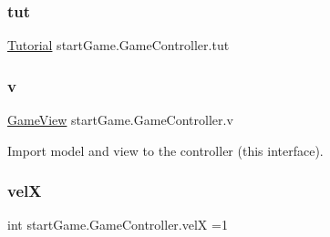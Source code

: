 \hypertarget{classstart_game_1_1_game_controller_ae807267b0bf97687ef3c7d57e815414e}{}\label{classstart_game_1_1_game_controller_ae807267b0bf97687ef3c7d57e815414e} 
\subsubsection{\texorpdfstring{tut}{tut}}
{\footnotesize\ttfamily \hyperlink{classview_1_1_tutorial}{Tutorial} start\+Game.\+Game\+Controller.\+tut\hspace{0.3cm}{\ttfamily [private]}}

\hypertarget{classstart_game_1_1_game_controller_a86e3c6ba6e8d0ecb0946da48fa55e7ee}{}\label{classstart_game_1_1_game_controller_a86e3c6ba6e8d0ecb0946da48fa55e7ee} 
\subsubsection{\texorpdfstring{v}{v}}
{\footnotesize\ttfamily \hyperlink{classview_1_1_game_view}{Game\+View} start\+Game.\+Game\+Controller.\+v\hspace{0.3cm}{\ttfamily [private]}}

Import model and view to the controller (this interface). \hypertarget{classstart_game_1_1_game_controller_a9de0dcbec624980f8b3808daa96ef457}{}\label{classstart_game_1_1_game_controller_a9de0dcbec624980f8b3808daa96ef457} 
\subsubsection{\texorpdfstring{velX}{velX}}
{\footnotesize\ttfamily int start\+Game.\+Game\+Controller.\+velX =1\hspace{0.3cm}{\ttfamily [private]}}

\hypertarget{classstart_game_1_1_game_controller_a5478c83b51a049015f9d4d6bc5c61607}{}\label{classstart_game_1_1_game_controller_a5478c83b51a049015f9d4d6bc5c61607} 
